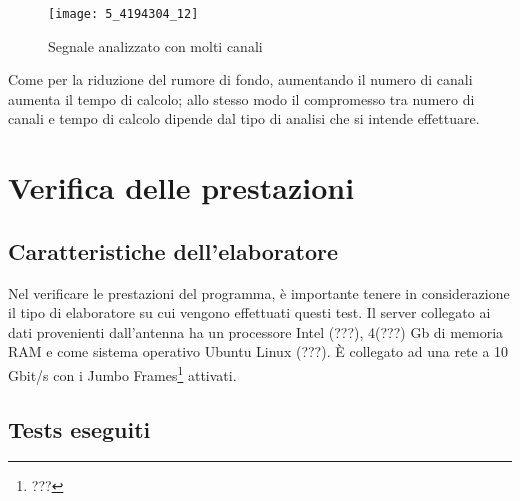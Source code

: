 \begin{figure}[htb]
	\begin{center}
		\texttt{[image: 5\_4194304\_12]}
	\end{center}
	\caption{Segnale analizzato con molti canali}
	\label{fig:high_chans}
\end{figure}

Come per la riduzione del rumore di fondo, aumentando il numero di canali
aumenta il tempo di calcolo; allo stesso modo il compromesso tra numero di
canali e tempo di calcolo dipende dal tipo di analisi che si intende effettuare.

\section{Verifica delle prestazioni}
\subsection{Caratteristiche dell'elaboratore}
Nel verificare le prestazioni del programma, \`e importante tenere in
considerazione il tipo di elaboratore su cui vengono effettuati questi test. Il
server collegato ai dati provenienti dall'antenna ha un processore Intel (???),
4(???) Gb di memoria RAM e come sistema operativo Ubuntu Linux (???). \`E
collegato ad una rete a 10 Gbit/s con i Jumbo Frames\footnote{???} attivati.
\subsection{Tests eseguiti}

